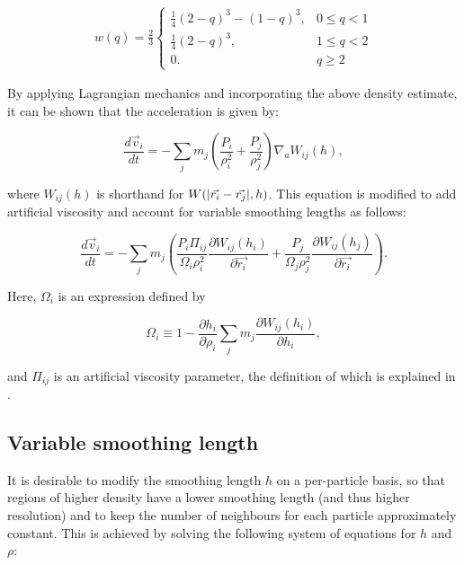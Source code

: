 \documentclass[onecolumn,12pt]{article}
\begin{document}
\begin{gather}
    w(q) = \frac{2}{3}
    \begin{cases}
        \frac{1}{4}(2-q)^3 - (1-q)^3, &0 \leq q < 1\\
        \frac{1}{4}(2-q)^3, &1 \leq q < 2\\
        0. &q \geq 2
    \end{cases}
\end{gather}

By applying Lagrangian mechanics and incorporating the above density estimate, it can be shown that the acceleration is given by:

\begin{equation}
    \frac{d \vec{v}_i}{dt} = -\sum\limits_j m_j \left(\frac{P_i}{\rho_i^2} + \frac{P_j}{\rho_j^2} \right)\nabla_a W_{ij}(h),
\end{equation}

where $W_{ij}(h)$ is shorthand for $W(|\vec{r_i} - \vec{r_j}|, h)$. This equation is modified to add artificial viscosity and account for variable smoothing lengths as follows:

\begin{equation}
    \frac{d \vec{v}_i}{dt} = -\sum\limits_j m_j \left(\frac{P_i \Pi_{{ij}}}{\Omega_i\rho_i^2}\frac{\partial W_{ij}(h_i)}{\partial \vec{r_i}} + \frac{P_j}{\Omega_j\rho_j^2}\frac{\partial W_{ij}(h_j)}{\partial \vec{r_i}} \right).
\end{equation}

Here, $\Omega_i$ is an expression defined by 

\begin{equation}
\Omega_i \equiv 1 - \frac{\partial h_i}{\partial \rho_i}\sum\limits_j m_j \frac{\partial W_{ij}(h_i)}{\partial h_i},
\end{equation}

and $\Pi_{ij}$ is an artificial viscosity parameter, the definition of which is explained in \citet{bate}.

\subsection{Variable smoothing length} \label{sec:h}
It is desirable to modify the smoothing length $h$ on a per-particle basis, so that regions of higher density have a lower smoothing length (and thus higher resolution) and to keep the number of neighbours for each particle approximately constant. This is achieved by solving the following system of equations for $h$ and $\rho$:
\end{document}
